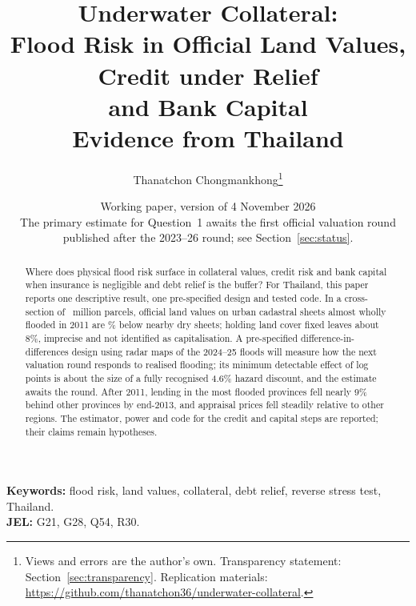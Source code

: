 \documentclass[11pt,a4paper]{article}
\title{\textbf{Underwater Collateral:}\\[2pt]
Flood Risk in Official Land Values, Credit under Relief\\and Bank Capital\\[6pt]
\large Evidence from Thailand}
\author{Thanatchon Chongmankhong\thanks{Views and errors are the author's own. Transparency statement: Section~\ref{sec:transparency}. Replication materials: \url{https://github.com/thanatchon36/underwater-collateral}.}}
\date{Working paper, version of 4 November 2026\\[2pt]
\small The primary estimate for Question~1 awaits the first official valuation round published after the 2023--26 round; see Section~\ref{sec:status}.}
\begin{document}
\maketitle

\begin{abstract}
\noindent
Where does physical flood risk surface in collateral values, credit risk and bank capital when insurance is negligible and debt relief is the buffer? For Thailand, this paper reports one descriptive result, one pre-specified design and tested code. In a cross-section of \pilotParcelsM~million parcels, official land values on urban cadastral sheets almost wholly flooded in 2011 are \binTopUrbanPct\% below nearby dry sheets; holding land cover fixed leaves about 8\%, imprecise and not identified as capitalisation. A pre-specified difference-in-differences design using radar maps of the 2024--25 floods will measure how the next valuation round responds to realised flooding; its minimum detectable effect of \regMdePooled{} log points is about the size of a fully recognised 4.6\% hazard discount, and the estimate awaits the round. After 2011, lending in the most flooded provinces fell nearly 9\% behind other provinces by end-2013, and appraisal prices fell steadily relative to other regions. The estimator, power and code for the credit and capital steps are reported; their claims remain hypotheses.
\end{abstract}

\noindent\textbf{Keywords:} flood risk, land values, collateral, debt relief, reverse stress test, Thailand.\\
\textbf{JEL:} G21, G28, Q54, R30.

\newpage














\appendix

\end{document}
